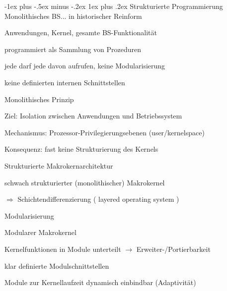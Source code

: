 \documentclass[a4paper]{article}
\makeatletter
\renewcommand{\subsubsection}{\@startsection{subsubsection}{3}{0mm}%
 {-1ex plus -.5ex minus -.2ex}%
 {1ex plus .2ex}%
 {\normalfont\small\bfseries}}
\makeatother
\begin{document}
\begin{multicols}{3}
    \subsubsection{Strukturierte Programmierung}
    Monolithisches BS... in historischer Reinform
    \begin{itemize*}
        \item Anwendungen, Kernel, gesamte BS-Funktionalität
        \item programmiert als Sammlung von Prozeduren
        \item jede darf jede davon aufrufen, keine Modularisierung
        \item keine definierten internen Schnittstellen
    \end{itemize*}

    Monolithisches Prinzip
    \begin{itemize*}
        \item Ziel: Isolation zwischen Anwendungen und Betriebssystem
        \item Mechanismus: Prozessor-Privilegierungsebenen (user/kernelspace)
        \item Konsequenz: fast keine Strukturierung des Kernels
    \end{itemize*}

    Strukturierte Makrokernarchitektur
    \begin{itemize*}
        \item schwach strukturierter (monolithischer) Makrokernel
        \item[$\Rightarrow$] Schichtendifferenzierung ( layered operating system )
        \item Modularisierung
    \end{itemize*}

    Modularer Makrokernel
    \begin{itemize*}
        \item Kernelfunktionen in Module unterteilt $\rightarrow$ Erweiter-/Portierbarkeit
        \item klar definierte Modulschnittstellen
        \item Module zur Kernellaufzeit dynamisch einbindbar (Adaptivität)
    \end{itemize*}


\end{multicols}
\end{document}
